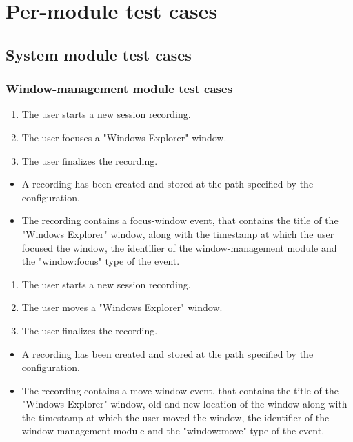 \section{Per-module test cases}

\subsection{System module test cases}

\subsubsection{Window-management module test cases}

\begin{tests}
	{\begin{enumerate}
		\item The \gls{user} starts a new \gls{session} recording.
		\item The \gls{user} focuses a "Windows Explorer" window.
		\item The \gls{user} finalizes the recording.
	\end{enumerate}}
	{\begin{itemize}
		\item A recording has been created and stored at the path specified by the configuration.
		\item The recording contains a focus-window \gls{event},  that contains the title of the "Windows Explorer" window, along with the timestamp at which the \gls{user} focused the window, the identifier of the window-management module and the "window:focus" type of the event.
	\end{itemize}}
	
	{\begin{enumerate}
		\item The \gls{user} starts a new \gls{session} recording.
		\item The \gls{user} moves a "Windows Explorer" window.
		\item The \gls{user} finalizes the recording.
	\end{enumerate}}
	{\begin{itemize}
		\item A recording has been created and stored at the path specified by the configuration.
		\item The recording contains a move-window \gls{event},  that contains the title of the "Windows Explorer" window, old and new location of the window along with the timestamp at which the \gls{user} moved the window, the identifier of the window-management module and the "window:move" type of the event.
	\end{itemize}}
	

\end{tests}

